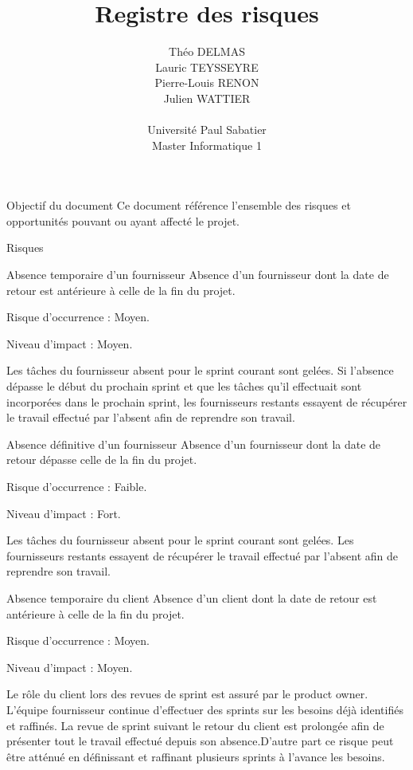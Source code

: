 \documentclass[]{article}
\title{Registre des risques}
\author{
    Théo DELMAS\\
    Lauric TEYSSEYRE\\
    Pierre-Louis RENON\\
    Julien WATTIER\\
    \\
    Université Paul Sabatier\\
    Master Informatique 1\\
   }
\begin{document}
\maketitle
\newpage
\tableofcontents
\newpage

\begin{section}{Objectif du document}
 Ce document référence l'ensemble des risques et opportunités pouvant ou ayant affecté le projet.
\end{section}

{
\setlength{\parindent}{0pt} %
\begin{section}{Risques}
 \begin{subsection}{Absence temporaire d'un fournisseur}
     Absence d'un fournisseur dont la date de retour est antérieure à celle de la fin du projet.

     Risque d’occurrence : Moyen.

     Niveau d’impact : Moyen.

     Les tâches du fournisseur absent pour le sprint courant sont gelées. Si l'absence dépasse le début du prochain sprint et que les tâches qu'il effectuait sont incorporées dans le prochain sprint, les fournisseurs restants essayent de récupérer le travail effectué par l'absent afin de reprendre son travail.
 \end{subsection}

 \begin{subsection}{Absence définitive d'un fournisseur}
     Absence d'un fournisseur dont la date de retour dépasse celle de la fin du projet.

     Risque d’occurrence : Faible.

     Niveau d’impact : Fort.

     Les tâches du fournisseur absent pour le sprint courant sont gelées. Les fournisseurs restants essayent de récupérer le travail effectué par l'absent afin de reprendre son travail.
 \end{subsection}

 \begin{subsection}{Absence temporaire du client}
     Absence d'un client dont la date de retour est antérieure à celle de la fin du projet.

     Risque d’occurrence : Moyen.

     Niveau d’impact : Moyen.

     Le rôle du client lors des revues de sprint est assuré par le product owner. L'équipe fournisseur continue d'effectuer des sprints sur les besoins déjà identifiés et raffinés. La revue de sprint suivant le retour du client est prolongée afin de présenter tout le travail effectué depuis son absence.D'autre part ce risque peut être atténué en définissant et raffinant plusieurs sprints à l'avance les besoins.
 \end{subsection}


\end{section}}
\end{document}
